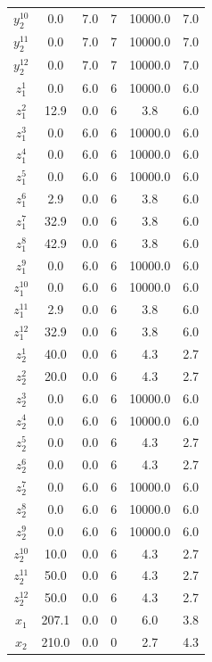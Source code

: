 \documentclass[a4paper,11pt]{article}
\begin{document}
\begin{longtable}{cccccc}
$y_2^{10}$ & 0.0 & 7.0 & 7 & 10000.0 & 7.0\\
$y_2^{11}$ & 0.0 & 7.0 & 7 & 10000.0 & 7.0\\
$y_2^{12}$ & 0.0 & 7.0 & 7 & 10000.0 & 7.0\\
$z_1^1$ & 0.0 & 6.0 & 6 & 10000.0 & 6.0\\
\addlinespace
$z_1^2$ & 12.9 & 0.0 & 6 & 3.8 & 6.0\\
$z_1^3$ & 0.0 & 6.0 & 6 & 10000.0 & 6.0\\
$z_1^4$ & 0.0 & 6.0 & 6 & 10000.0 & 6.0\\
$z_1^5$ & 0.0 & 6.0 & 6 & 10000.0 & 6.0\\
$z_1^6$ & 2.9 & 0.0 & 6 & 3.8 & 6.0\\
\addlinespace
$z_1^7$ & 32.9 & 0.0 & 6 & 3.8 & 6.0\\
$z_1^8$ & 42.9 & 0.0 & 6 & 3.8 & 6.0\\
$z_1^9$ & 0.0 & 6.0 & 6 & 10000.0 & 6.0\\
$z_1^{10}$ & 0.0 & 6.0 & 6 & 10000.0 & 6.0\\
$z_1^{11}$ & 2.9 & 0.0 & 6 & 3.8 & 6.0\\
\addlinespace
$z_1^{12}$ & 32.9 & 0.0 & 6 & 3.8 & 6.0\\
$z_2^1$ & 40.0 & 0.0 & 6 & 4.3 & 2.7\\
$z_2^2$ & 20.0 & 0.0 & 6 & 4.3 & 2.7\\
$z_2^3$ & 0.0 & 6.0 & 6 & 10000.0 & 6.0\\
$z_2^4$ & 0.0 & 6.0 & 6 & 10000.0 & 6.0\\
\addlinespace
$z_2^5$ & 0.0 & 0.0 & 6 & 4.3 & 2.7\\
$z_2^6$ & 0.0 & 0.0 & 6 & 4.3 & 2.7\\
$z_2^7$ & 0.0 & 6.0 & 6 & 10000.0 & 6.0\\
$z_2^8$ & 0.0 & 6.0 & 6 & 10000.0 & 6.0\\
$z_2^9$ & 0.0 & 6.0 & 6 & 10000.0 & 6.0\\
\addlinespace
$z_2^{10}$ & 10.0 & 0.0 & 6 & 4.3 & 2.7\\
$z_2^{11}$ & 50.0 & 0.0 & 6 & 4.3 & 2.7\\
$z_2^{12}$ & 50.0 & 0.0 & 6 & 4.3 & 2.7\\
$x_1$ & 207.1 & 0.0 & 0 & 6.0 & 3.8\\
$x_2$ & 210.0 & 0.0 & 0 & 2.7 & 4.3\\*
\end{longtable}
\endgroup{}
\end{document}
